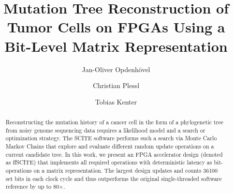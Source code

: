 \documentclass[sigconf]{acmart}
\begin{document}
\title[]{Mutation Tree Reconstruction of Tumor Cells on FPGAs Using a Bit-Level Matrix Representation}

\author{Jan-Oliver Opdenhövel}

\author{Christian Plessl}

\author{Tobias Kenter}

\renewcommand{\shortauthors}{Opdenhövel, Plessl, Kenter}

\begin{abstract}
    Reconstructing the mutation history of a cancer cell in the form of a phylogenetic tree 
    from noisy genome sequencing data requires a likelihood model and a search or optimization strategy. The \ac{SCITE} software performs such a search via Monte Carlo Markov Chains that explore and evaluate different random update operations on a current candidate tree.
    In this work, we present an FPGA accelerator design (denoted as \ac{ffSCITE}) that implements all required operations with deterministic latency as bit-operations on a matrix representation. The largest design updates and counts 36100 set bits in each clock cycle and thus outperforms the original single-threaded software reference by up to 80$\times$.
\end{abstract}
\end{document}
